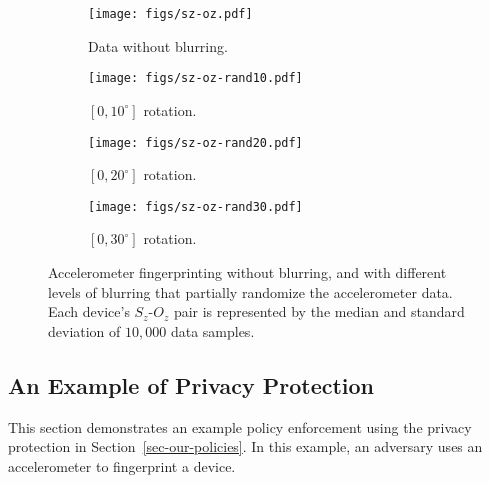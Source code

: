 \begin{figure*}
\centering
\begin{subfigure}[b]{.25\textwidth}
  \centering
  \texttt{[image: figs/sz-oz.pdf]}
  \caption{Data without blurring.}
  \label{fig:sub1}
\end{subfigure}%
\begin{subfigure}[b]{.25\textwidth}
  \centering
  \texttt{[image: figs/sz-oz-rand10.pdf]}
  \caption{$[0, 10^{\circ}]$ rotation.}
  \label{fig:sub2}
\end{subfigure}%
\begin{subfigure}[b]{.25\textwidth}
  \centering
  \texttt{[image: figs/sz-oz-rand20.pdf]}
  \caption{$[0, 20^{\circ}]$ rotation.}
  \label{fig:sub3}
\end{subfigure}%
\begin{subfigure}[b]{.25\textwidth}
  \centering
  \texttt{[image: figs/sz-oz-rand30.pdf]}
  \caption{$[0, 30^{\circ}]$ rotation.}
  \label{fig:sub3}
\end{subfigure}%

\caption{\small Accelerometer fingerprinting without blurring, and with different levels of 
blurring that partially randomize the accelerometer data. Each device's $S_z$-$O_z$
pair is represented by the median and standard deviation of $10,000$ data samples.}

\label{fig:fingerprinting}
\end{figure*}

\subsection{An Example of Privacy Protection}\label{sec-experiment}

This section demonstrates an example policy enforcement using the 
privacy protection in Section~\ref{sec-our-policies}. In this example, an 
adversary uses an accelerometer to fingerprint a device. 


